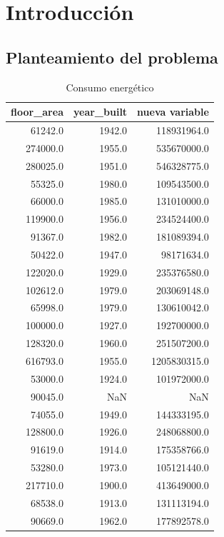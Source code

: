 \section[Introducción]{Introducción}

\lipsum[1-3]
\lista{
    \item \lipsum[1]
    \item \lipsum[1]
}


\lipsum[1]

\subsection{Planteamiento del problema}

\lipsum[1-3]

\begin{table}[h!]
    \centering
    \begin{tabular}{rrr}
\toprule
 floor\_area &  year\_built &  nueva variable \\
\midrule
    61242.0 &      1942.0 &     118931964.0 \\
   274000.0 &      1955.0 &     535670000.0 \\
   280025.0 &      1951.0 &     546328775.0 \\
    55325.0 &      1980.0 &     109543500.0 \\
    66000.0 &      1985.0 &     131010000.0 \\
   119900.0 &      1956.0 &     234524400.0 \\
    91367.0 &      1982.0 &     181089394.0 \\
    50422.0 &      1947.0 &      98171634.0 \\
   122020.0 &      1929.0 &     235376580.0 \\
   102612.0 &      1979.0 &     203069148.0 \\
    65998.0 &      1979.0 &     130610042.0 \\
   100000.0 &      1927.0 &     192700000.0 \\
   128320.0 &      1960.0 &     251507200.0 \\
   616793.0 &      1955.0 &    1205830315.0 \\
    53000.0 &      1924.0 &     101972000.0 \\
    90045.0 &         NaN &             NaN \\
    74055.0 &      1949.0 &     144333195.0 \\
   128800.0 &      1926.0 &     248068800.0 \\
    91619.0 &      1914.0 &     175358766.0 \\
    53280.0 &      1973.0 &     105121440.0 \\
   217710.0 &      1900.0 &     413649000.0 \\
    68538.0 &      1913.0 &     131113194.0 \\
    90669.0 &      1962.0 &     177892578.0 \\
\bottomrule
\end{tabular}
    \caption{Consumo energético}
    \label{tab:my_label}
\end{table}

